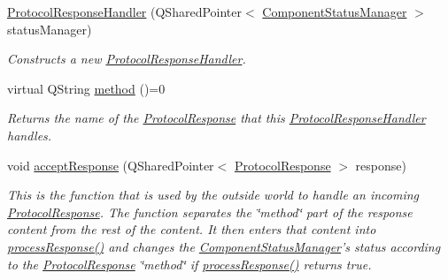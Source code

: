 \begin{DoxyCompactItemize}
\item 
\hyperlink{struct_picto_1_1_protocol_response_handler_a8fde393262b9264513a5543bc2e6c46c}{Protocol\-Response\-Handler} (Q\-Shared\-Pointer$<$ \hyperlink{class_component_status_manager}{Component\-Status\-Manager} $>$ status\-Manager)
\begin{DoxyCompactList}\small\item\em Constructs a new \hyperlink{struct_picto_1_1_protocol_response_handler}{Protocol\-Response\-Handler}. \end{DoxyCompactList}\item 
\hypertarget{struct_picto_1_1_protocol_response_handler_ab690fe4ac7acee977f740574c44a27df}{virtual Q\-String \hyperlink{struct_picto_1_1_protocol_response_handler_ab690fe4ac7acee977f740574c44a27df}{method} ()=0}\label{struct_picto_1_1_protocol_response_handler_ab690fe4ac7acee977f740574c44a27df}

\begin{DoxyCompactList}\small\item\em Returns the name of the \hyperlink{struct_picto_1_1_protocol_response}{Protocol\-Response} that this \hyperlink{struct_picto_1_1_protocol_response_handler}{Protocol\-Response\-Handler} handles. \end{DoxyCompactList}\item 
\hypertarget{struct_picto_1_1_protocol_response_handler_ae0a1c0dc753452bb319e8ecba2b866eb}{void \hyperlink{struct_picto_1_1_protocol_response_handler_ae0a1c0dc753452bb319e8ecba2b866eb}{accept\-Response} (Q\-Shared\-Pointer$<$ \hyperlink{struct_picto_1_1_protocol_response}{Protocol\-Response} $>$ response)}\label{struct_picto_1_1_protocol_response_handler_ae0a1c0dc753452bb319e8ecba2b866eb}

\begin{DoxyCompactList}\small\item\em This is the function that is used by the outside world to handle an incoming \hyperlink{struct_picto_1_1_protocol_response}{Protocol\-Response}. The function separates the \char`\"{}method\char`\"{} part of the response content from the rest of the content. It then enters that content into \hyperlink{struct_picto_1_1_protocol_response_handler_a91333b76cb524cde73bdb7e3e4d1e8be}{process\-Response()} and changes the \hyperlink{class_component_status_manager}{Component\-Status\-Manager}'s status according to the \hyperlink{struct_picto_1_1_protocol_response}{Protocol\-Response} \char`\"{}method\char`\"{} if \hyperlink{struct_picto_1_1_protocol_response_handler_a91333b76cb524cde73bdb7e3e4d1e8be}{process\-Response()} returns true. \end{DoxyCompactList}\end{DoxyCompactItemize}
